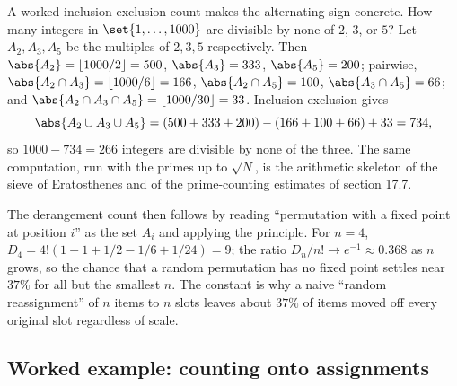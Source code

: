 A worked inclusion-exclusion count makes the alternating sign
concrete. How many integers in $\set{1, \ldots, 1000}$ are divisible
by none of $2$, $3$, or $5$? Let $A_{2}, A_{3}, A_{5}$ be the
multiples of $2, 3, 5$ respectively. Then $\abs{A_{2}} = \lfloor
1000/2 \rfloor = 500$, $\abs{A_{3}} = 333$, $\abs{A_{5}} = 200$;
pairwise, $\abs{A_{2} \cap A_{3}} = \lfloor 1000/6 \rfloor = 166$,
$\abs{A_{2} \cap A_{5}} = 100$, $\abs{A_{3} \cap A_{5}} = 66$; and
$\abs{A_{2} \cap A_{3} \cap A_{5}} = \lfloor 1000/30 \rfloor = 33$.
Inclusion-exclusion gives
\[
\abs{A_{2} \cup A_{3} \cup A_{5}}
= (500 + 333 + 200) - (166 + 100 + 66) + 33 = 734,
\]
so $1000 - 734 = 266$ integers are divisible by none of the three.
The same computation, run with the primes up to $\sqrt{N}$, is the
arithmetic skeleton of the sieve of Eratosthenes and of the
prime-counting estimates of section 17.7.

The derangement count then follows by reading ``permutation with a
fixed point at position $i$'' as the set $A_{i}$ and applying the
principle. For $n = 4$, $D_{4} = 4!(1 - 1 + 1/2 - 1/6 + 1/24) = 9$;
the ratio $D_{n}/n! \to e^{-1} \approx 0.368$ as $n$ grows, so the
chance that a random permutation has no fixed point settles near
$37\%$ for all but the smallest $n$. The constant is why a
naive ``random reassignment'' of $n$ items to $n$ slots leaves about
$37\%$ of items moved off every original slot regardless of scale.

\subsection{Worked example: counting onto assignments}

